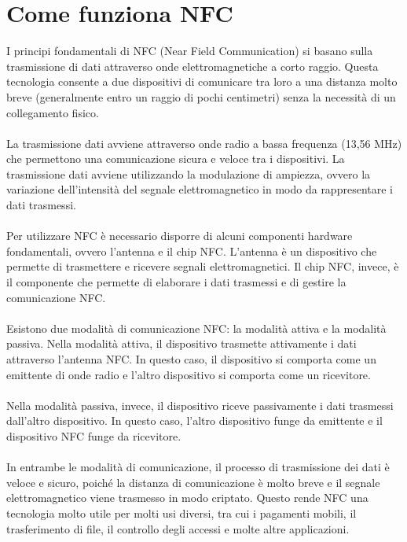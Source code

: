 \documentclass[a4paper,11pt]{report}
\begin{document}
\chapter{Come funziona NFC}
I principi fondamentali di NFC (Near Field Communication) si basano sulla trasmissione di dati attraverso onde elettromagnetiche a corto raggio. Questa tecnologia consente a due dispositivi di comunicare tra loro a una distanza molto breve (generalmente entro un raggio di pochi centimetri) senza la necessità di un collegamento fisico.\\\\ La trasmissione dati avviene attraverso onde radio a bassa frequenza (13,56 MHz) che permettono una comunicazione sicura e veloce tra i dispositivi. La trasmissione dati avviene utilizzando la modulazione di ampiezza, ovvero la variazione dell'intensità del segnale elettromagnetico in modo da rappresentare i dati trasmessi.\\\\ Per utilizzare NFC è necessario disporre di alcuni componenti hardware fondamentali, ovvero l'antenna e il chip NFC. L'antenna è un dispositivo che permette di trasmettere e ricevere segnali elettromagnetici. Il chip NFC, invece, è il componente che permette di elaborare i dati trasmessi e di gestire la comunicazione NFC.\\\\Esistono due modalità di comunicazione NFC: la modalità attiva e la modalità passiva. Nella modalità attiva, il dispositivo trasmette attivamente i dati attraverso l'antenna NFC. In questo caso, il dispositivo si comporta come un emittente di onde radio e l'altro dispositivo si comporta come un ricevitore.\\\\ Nella modalità passiva, invece, il dispositivo riceve passivamente i dati trasmessi dall'altro dispositivo. In questo caso, l'altro dispositivo funge da emittente e il dispositivo NFC funge da ricevitore.\\\\ In entrambe le modalità di comunicazione, il processo di trasmissione dei dati è veloce e sicuro, poiché la distanza di comunicazione è molto breve e il segnale elettromagnetico viene trasmesso in modo criptato. Questo rende NFC una tecnologia molto utile per molti usi diversi, tra cui i pagamenti mobili, il trasferimento di file, il controllo degli accessi e molte altre applicazioni.
\end{document}
